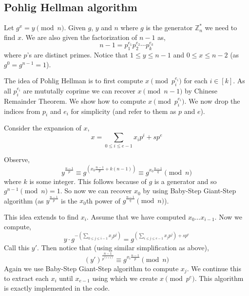 \documentclass[letterpaper,12pt]{article}
\theoremstyle{remark}
\begin{document}
\subsection{Pohlig Hellman algorithm}

Let $g^x = y \pmod n$. Given $g$, $y$ and $n$ where $g$ is the generator $\mathbb{Z}^*_{n}$ we need to find $x$. We are also given the factorization of $n-1$ as,
\begin{equation*}
    n-1 = p_1^{e_1} p_2^{e_2} \cdots p_k^{e_k}
\end{equation*}
where $p$'s are distinct primes. Notice that $1 \le y \le n-1$ and $0 \le x \le n-2$ (as $g^0 = g^{n-1} = 1$).

The idea of Pohlig Hellman is to first compute $x \pmod {p_i^{e_i}}$ for each $i \in [k]$. As all $p_i^{e_i}$ are mututally coprime we can recover $x \pmod {n-1}$ by Chinese Remainder Theorem. We show how to compute $x \pmod {p_i^{e_i}}$. We now drop the indices from $p_i$ and $e_i$ for simplicity (and refer to them as $p$ and $e$).

Consider the expansion of $x$,
\begin{equation*}
    x = \sum_{0 \le i \le e-1} x_i p^i + sp^e
\end{equation*}

Observe,
\begin{equation*}
    y^{\frac{n-1}{p}} \equiv g^{\left(x_0 \frac{n-1}{p} + k(n-1)\right)} \equiv g^{x_0 \frac{n-1}{q}} \pmod n 
\end{equation*}
where $k$ is some integer.
This follows because of $g$ is a generator and so $g^{n-1} \pmod n = 1$. So now we can recover $x_0$ by using Baby-Step Giant-Step algorithm (as $y^{\frac{n-1}{p}}$ is the $x_0$th power of $g^{\frac{n-1}{q}} \pmod n$). 

This idea extends to find $x_i$. Assume that we have computed $x_0 \dots x_{i-1}$. Now we compute, 
\begin{equation*}
    y\cdot g^{-(\sum_{0\le j \le i-1} x_j p^j)} = g^{(\sum_{i \le j \le e-1} x_j p^j) + sp^e}
\end{equation*}
Call this $y'$. Then notice that (using similar simplification as above),
\begin{equation*}
    (y')^{\frac{n-1}{p^{(i+1)}}} \equiv g^{x_i \frac{n-1}{p}} \pmod n 
\end{equation*}
Again we use Baby-Step Giant-Step algorithm to compute $x_j$. We continue this to extract each $x_i$ until $x_{e-1}$ using which we create $x \pmod {p^e}$. This algorithm is exactly implemented in the code.
\end{document}
